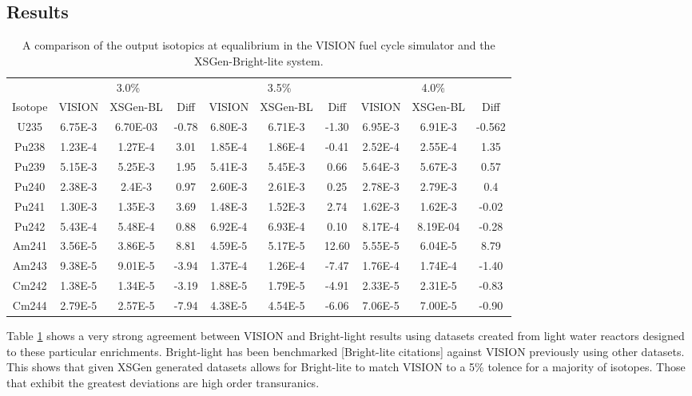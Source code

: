 \documentclass{article}
\begin{document}
\subsection{Results}
\begin{table}[!htb]
\centering
\caption{A comparison of the output isotopics at equalibrium in the VISION fuel cycle simulator and the XSGen-Bright-lite system.}
\label{tab:a}
\begin{tabular}{c| c c c| c c c | c c c |}
 & \multicolumn{3}{c}{3.0\%} & \multicolumn{3}{c}{3.5\%} & \multicolumn{3}{c}{4.0\%} \\
Isotope & VISION & XSGen-BL & Diff & VISION & XSGen-BL & Diff & VISION & XSGen-BL & Diff \\
\hline
U235 & 6.75E-3 & 6.70E-03 & -0.78 & 6.80E-3 & 6.71E-3 & -1.30 & 6.95E-3 & 6.91E-3 & -0.562 \\
Pu238 & 1.23E-4 & 1.27E-4 & 3.01 & 1.85E-4 & 1.86E-4 & -0.41 & 2.52E-4 & 2.55E-4 & 1.35 \\
Pu239 & 5.15E-3 & 5.25E-3 & 1.95 & 5.41E-3 & 5.45E-3 & 0.66 & 5.64E-3 & 5.67E-3 & 0.57 \\
Pu240 & 2.38E-3 & 2.4E-3 & 0.97 & 2.60E-3 & 2.61E-3 & 0.25 & 2.78E-3 & 2.79E-3 & 0.4 \\
Pu241 & 1.30E-3 & 1.35E-3 & 3.69 & 1.48E-3 & 1.52E-3 & 2.74 & 1.62E-3 & 1.62E-3 & -0.02 \\
Pu242 & 5.43E-4 & 5.48E-4 & 0.88 & 6.92E-4 & 6.93E-4 & 0.10 & 8.17E-4 & 8.19E-04 & -0.28 \\
Am241 & 3.56E-5 & 3.86E-5 & 8.81 & 4.59E-5 & 5.17E-5 & 12.60 & 5.55E-5 & 6.04E-5 & 8.79 \\
Am243 & 9.38E-5 & 9.01E-5 & -3.94 & 1.37E-4 & 1.26E-4 & -7.47 & 1.76E-4 & 1.74E-4 & -1.40 \\
Cm242 & 1.38E-5 & 1.34E-5 & -3.19 & 1.88E-5 & 1.79E-5 & -4.91 & 2.33E-5 & 2.31E-5 & -0.83 \\
Cm244 & 2.79E-5 & 2.57E-5 & -7.94 & 4.38E-5 & 4.54E-5 & -6.06 & 7.06E-5 & 7.00E-5 & -0.90 \\
\hline
\end{tabular}
\end{table}

Table \ref{tab:a} shows a very strong agreement between VISION and Bright-light results using datasets created from light water reactors designed to these particular enrichments. Bright-light has been benchmarked [Bright-lite citations] against VISION previously using other datasets. This shows that given XSGen generated datasets allows for Bright-lite to match VISION to a 5\% tolence for a majority of isotopes. Those that exhibit the greatest deviations are high order transuranics. 
\end{document}
